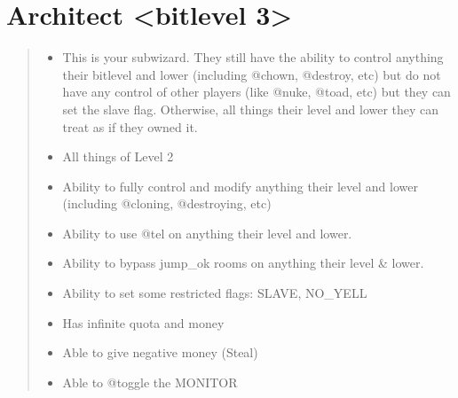 \documentclass[letterpaper,10pt,english]{sphinxmanual}
\begin{document}
\section{Architect \textless{}bitlevel 3\textgreater{}}
\label{\detokenize{15-bitlevels:architect-bitlevel-3}}\begin{quote}
\begin{itemize}
\item {} 
\sphinxAtStartPar
This is your sub\sphinxhyphen{}wizard.  They still have the ability to control
anything their bitlevel and lower (including @chown, @destroy, etc)
but do not have any control of other players (like @nuke, @toad, etc)
but they can set the slave flag.  Otherwise, all things their level
and lower they can treat as if they owned it.

\end{itemize}
\begin{itemize}
\item {} 
\sphinxAtStartPar
All things of Level 2

\item {} 
\sphinxAtStartPar
Ability to fully control and modify anything their level and
lower (including @cloning, @destroying, etc)

\item {} 
\sphinxAtStartPar
Ability to use @tel on anything their level and lower.

\item {} 
\sphinxAtStartPar
Ability to bypass jump\_ok rooms on anything their level \& lower.

\item {} 
\sphinxAtStartPar
Ability to set some restricted flags: SLAVE, NO\_YELL

\item {} 
\sphinxAtStartPar
Has infinite quota and money

\item {} 
\sphinxAtStartPar
Able to give negative money (Steal)

\item {} 
\sphinxAtStartPar
Able to @toggle the MONITOR

\end{itemize}
\end{quote}
\end{document}
